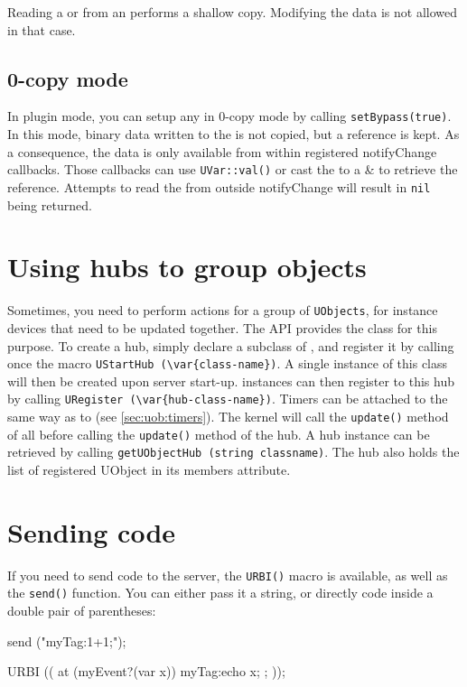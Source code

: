 Reading a \USound or \UImage from an \UVar performs a shallow copy. Modifying
the data is not allowed in that case.

\subsection{0-copy mode}
In plugin mode, you can setup any \UVar in 0-copy mode by calling
\lstinline{setBypass(true)}. In this mode, binary data written to the \UVar
is not copied, but a reference is kept.
As a consequence, the data is only available from within registered
notifyChange callbacks. Those callbacks can use \lstinline|UVar::val()| or
cast the \UVar to a \UBinary\& to retrieve the reference.
Attempts to read the \UVar from outside notifyChange will result in
\lstinline{nil} being returned.

\section{Using hubs to group objects}

Sometimes, you need to perform actions for a group of
\lstinline{UObjects}, for instance devices that need to be updated
together. The API provides the \UObjectHub class for this
purpose. To create a hub, simply declare a subclass of
\UObjectHub, and register it by calling once the macro
\lstinline|UStartHub (\var{class-name})|. A single instance of this class
will then be created upon server start-up. \UObject
instances can then register to this hub by calling
\lstinline|URegister (\var{hub-class-name})|. Timers can be attached to
\UObjectHub the same way as to \UObject (see
\autoref{sec:uob:timers}). The kernel will call the \lstinline{update()}
method of all \UObject before calling the
\lstinline{update()} method of the hub. A hub instance can be
retrieved by calling \lstinline{getUObjectHub (string classname)}. The
hub also holds the list of registered UObject in its members
attribute.

\section{Sending \urbi code}

If you need to send \urbi code to the server, the \lstinline{URBI()}
macro is available, as well as the \lstinline{send()} function. You
can either pass it a string, or directly \urbi code inside a double
pair of parentheses:

\begin{urbiunchecked}
send ("myTag:1+1;");

URBI (( at (myEvent?(var x)) { myTag:echo x; }; ));
\end{urbiunchecked}

